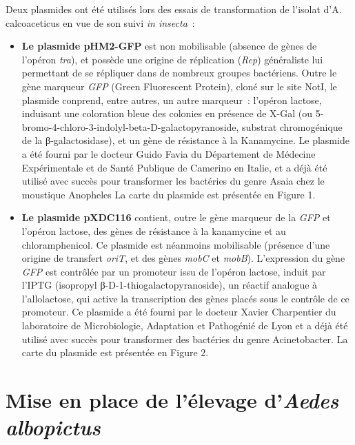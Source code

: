 Deux plasmides ont été utilisés lors des essais de transformation de l’isolat d’A. calcoaceticus en vue de son suivi \textit{in insecta}~:
\begin{itemize}
\item \textbf{Le plasmide pHM2-GFP} est non mobilisable (absence de gènes de l'opéron \textit{tra}), et possède une origine de réplication (\textit{Rep}) généraliste lui permettant de se répliquer dans de nombreux groupes bactériens.
Outre le gène marqueur \textit{GFP} (Green Fluorescent Protein), cloné sur le site NotI, le plasmide conprend, entre autres, un autre marqueur~: l'opéron lactose, induisant une coloration bleue des colonies en présence de X-Gal (ou 5-bromo-4-chloro-3-indolyl-beta-D-galactopyranoside, substrat chromogénique de la β-galactosidase), et un gène de résistance à la Kanamycine.
Le plasmide a été fourni par le docteur Guido Favia du Département de Médecine Expérimentale et de Santé Publique de Camerino en Italie, et a déjà été utilisé avec succès pour transformer les bactéries du genre Asaia chez le moustique Anopheles \cite{favia2007}
La carte du plasmide est présentée en Figure 1.

\item \textbf{Le plasmide pXDC116} contient, outre le gène marqueur de la \textit{GFP} et l'opéron lactose, des gènes de résistance à la kanamycine et au chloramphenicol. Ce plasmide est néanmoins mobilisable (présence d'une origine de transfert \textit{oriT}, et des gènes \textit{mobC} et \textit{mobB}).
L'expression du gène \textit{GFP} est contrôlée par un promoteur issu de l'opéron lactose, induit par l'IPTG (isopropyl β-D-1-thiogalactopyranoside), un réactif analogue à l'allolactose, qui active la transcription des gènes placés sous le contrôle de ce promoteur.
Ce plasmide a été fourni par le docteur Xavier Charpentier du laboratoire de Microbiologie, Adaptation et Pathogénié de Lyon et a déjà été utilisé avec succès pour transformer des bactéries du genre Acinetobacter. La carte du plasmide est présentée en Figure 2.

\end{itemize}


\section{Mise en place de l'élevage d'\textit{Aedes albopictus}}

